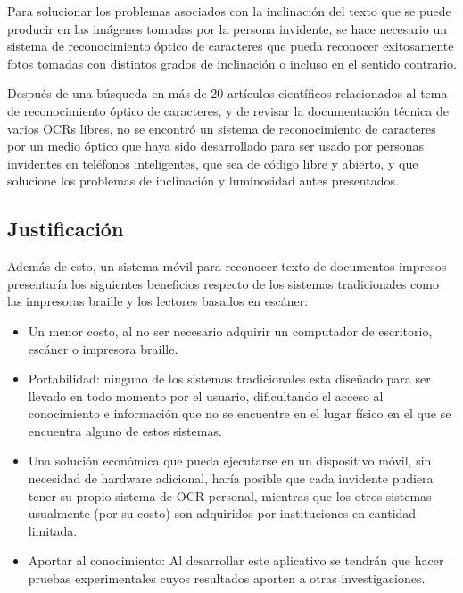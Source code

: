 \documentclass[a4paper, 12pt, oneside]{article}
\begin{document}
	Para solucionar los problemas asociados con la inclinación del texto que se puede producir en las imágenes tomadas por la persona invidente, se hace necesario un sistema de reconocimiento óptico de caracteres que pueda reconocer exitosamente fotos tomadas con distintos grados de inclinación o incluso en el sentido contrario.

	Después de una búsqueda en más de 20 artículos científicos relacionados al tema de reconocimiento óptico de caracteres, y de revisar la documentación técnica de varios OCRs libres, no se encontró un sistema de reconocimiento de caracteres por un medio óptico que haya sido desarrollado para ser usado por personas invidentes en teléfonos inteligentes, que sea de código libre y abierto, y que solucione los problemas de inclinación y luminosidad antes presentados. 	
	
	\clearpage

	\begin{center}
	\section{Justificación}
	\end{center}
	
	Además de esto, un sistema móvil para reconocer texto de documentos impresos presentaría los siguientes beneficios respecto de los sistemas tradicionales como las impresoras braille y los lectores basados en escáner:

	\begin{itemize} 

	\item Un menor costo, al no ser necesario adquirir un computador de escritorio, escáner o impresora braille.

	\item Portabilidad: ninguno de los sistemas tradicionales esta diseñado para ser llevado en todo momento por el usuario, dificultando el acceso al conocimiento e información que no se encuentre en el lugar físico en el que se encuentra alguno de estos sistemas.
	
	\item Una solución económica que pueda ejecutarse en un dispositivo móvil, sin necesidad de hardware adicional, haría posible que cada invidente pudiera tener su propio sistema de OCR personal, mientras que los otros sistemas usualmente (por su costo) son adquiridos por instituciones en cantidad limitada.

	\item Aportar al conocimiento: Al desarrollar este aplicativo se tendrán que hacer pruebas experimentales cuyos resultados aporten a otras investigaciones.
	\end{itemize}
	\clearpage
\end{document}
